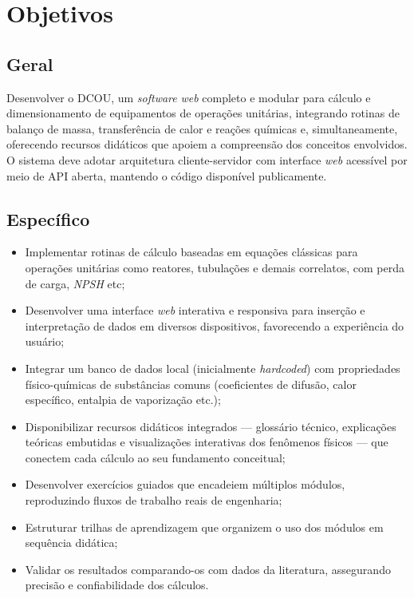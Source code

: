 \chapter{Objetivos}

\section{Geral}

Desenvolver o DCOU, um \textit{software} \textit{web} completo e modular para cálculo e dimensionamento de equipamentos de operações unitárias, integrando rotinas de balanço de massa, transferência de calor e reações químicas e, simultaneamente, oferecendo recursos didáticos que apoiem a compreensão dos conceitos envolvidos. O sistema deve adotar arquitetura cliente-servidor com interface \textit{web} acessível por meio de API aberta, mantendo o código disponível publicamente.

\section{Específico}

\begin{itemize}
    \item Implementar rotinas de cálculo baseadas em equações clássicas para operações unitárias como reatores, tubulações e demais correlatos, com perda de carga, \textit{NPSH} etc;
    \item Desenvolver uma interface \textit{web} interativa e responsiva para inserção e interpretação de dados em diversos dispositivos, favorecendo a experiência do usuário;
    \item Integrar um banco de dados local (inicialmente \textit{hardcoded}) com propriedades físico-químicas de substâncias comuns (coeficientes de difusão, calor específico, entalpia de vaporização etc.);
    \item Disponibilizar recursos didáticos integrados --- glossário técnico, explicações teóricas embutidas e visualizações interativas dos fenômenos físicos --- que conectem cada cálculo ao seu fundamento conceitual;
    \item Desenvolver exercícios guiados que encadeiem múltiplos módulos, reproduzindo fluxos de trabalho reais de engenharia;
    \item Estruturar trilhas de aprendizagem que organizem o uso dos módulos em sequência didática;
    \item Validar os resultados comparando-os com dados da literatura, assegurando precisão e confiabilidade dos cálculos.
\end{itemize}
